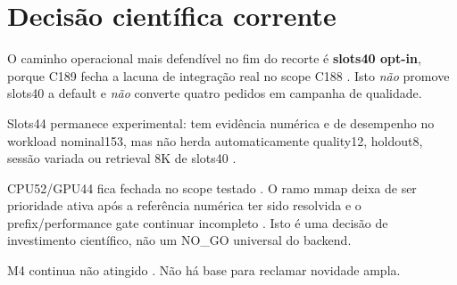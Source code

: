 \section{Decisão científica corrente}
O caminho operacional mais defendível no fim do recorte é \textbf{slots40 opt-in}, porque C189 fecha a lacuna de integração real no scope C188 . Isto \emph{não} promove slots40 a default e \emph{não} converte quatro pedidos em campanha de qualidade.

Slots44 permanece experimental: tem evidência numérica e de desempenho no workload nominal153, mas não herda automaticamente quality12, holdout8, sessão variada ou retrieval 8K de slots40 .

CPU52/GPU44 fica fechada no scope testado . O ramo mmap deixa de ser prioridade ativa após a referência numérica ter sido resolvida e o prefix/performance gate continuar incompleto . Isto é uma decisão de investimento científico, não um NO\_GO universal do backend.

M4 continua não atingido . Não há base para reclamar novidade ampla.
